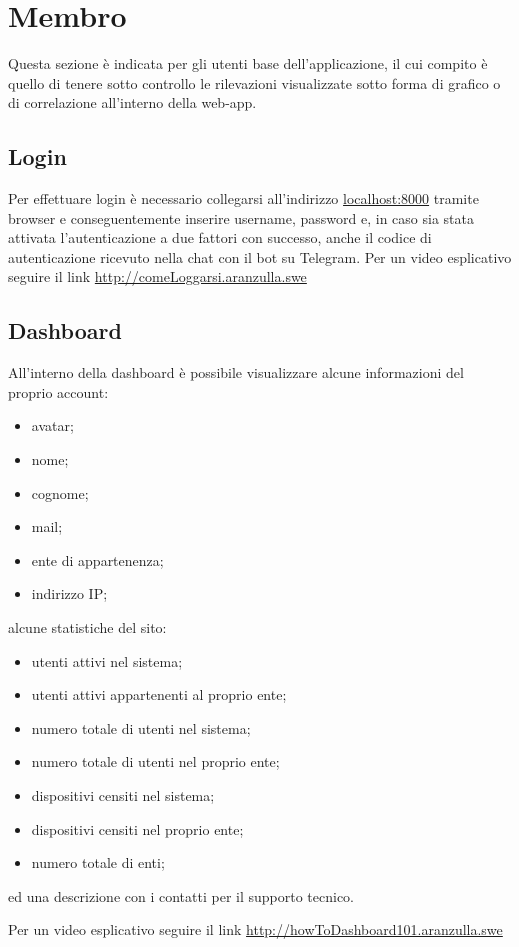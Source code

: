 \section{Membro}
Questa sezione è indicata per gli utenti base dell'applicazione, il cui compito è quello di tenere sotto controllo le rilevazioni visualizzate sotto forma di grafico o di correlazione all'interno della web-app.

\subsection{Login}
Per effettuare login è necessario collegarsi all'indirizzo \url{localhost:8000} tramite browser e conseguentemente inserire username, password e, in caso sia stata attivata l'autenticazione a due fattori con successo, anche il codice di autenticazione ricevuto nella chat con il bot su Telegram.
Per un video esplicativo seguire il link \url{http://comeLoggarsi.aranzulla.swe}

\subsection{Dashboard}
All'interno della dashboard è possibile visualizzare alcune informazioni del proprio account:
\begin{itemize}
	\item avatar;
	\item nome;
	\item cognome;
	\item mail;
	\item ente di appartenenza;
	\item indirizzo IP;
\end{itemize}

alcune statistiche del sito:
\begin{itemize}
	\item utenti attivi nel sistema;
	\item utenti attivi appartenenti al proprio ente;
	\item numero totale di utenti nel sistema;
	\item numero totale di utenti nel proprio ente;
	\item dispositivi censiti nel sistema;
	\item dispositivi censiti nel proprio ente;
	\item numero totale di enti;
\end{itemize}

ed una descrizione con i contatti per il supporto tecnico.

Per un video esplicativo seguire il link \url{http://howToDashboard101.aranzulla.swe}